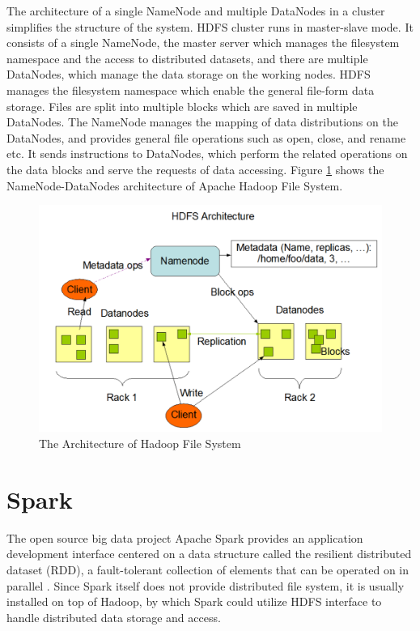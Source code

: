 The architecture of a single NameNode and multiple DataNodes in a cluster simplifies the structure of the system. HDFS cluster runs in master-slave mode.  It consists of a single NameNode, the master server which manages the filesystem namespace and the access to distributed datasets, and there are multiple DataNodes, which manage the data storage on the working nodes. HDFS manages the filesystem namespace which enable the general file-form data storage. Files are split into multiple blocks which are saved in multiple DataNodes. The NameNode manages the mapping of data distributions on the DataNodes, and provides general file operations such as open, close, and rename etc. It sends instructions to DataNodes, which perform the related operations on the data blocks and serve the requests of data accessing. Figure \ref{HDFSArch} shows the NameNode-DataNodes architecture of Apache Hadoop File System.

\begin{figure}[h]
\centering
\includegraphics[scale=0.4]{figures/HDFSArch.png}
\caption{The Architecture of Hadoop File System \cite{ApacheHadoop}}
\label{HDFSArch}
\end{figure}

\section{Spark}

The open source big data project Apache Spark provides an application development interface centered on a data structure called the resilient distributed dataset (RDD), a fault-tolerant collection of elements that can be operated on in parallel \cite{ApacheSpark}. Since Spark itself does not provide distributed file system, it is usually installed on top of Hadoop, by which Spark could utilize HDFS interface to handle distributed data storage and access. 

